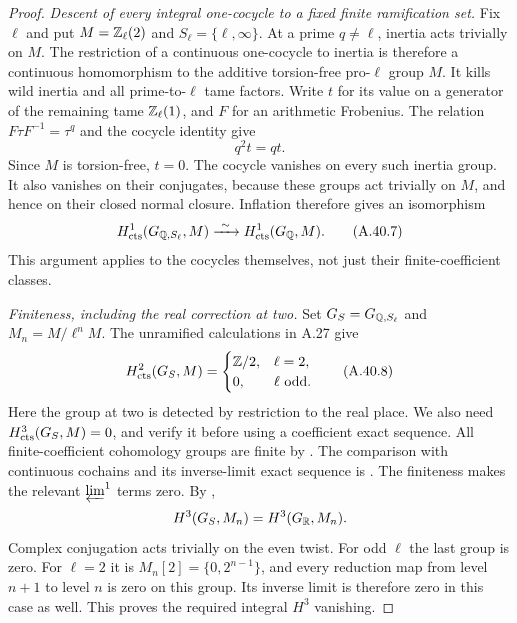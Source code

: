 \begin{proof}
\emph{Descent of every integral one-cocycle to a fixed finite
ramification set.}
Fix $\ell$ and put $M=\mathbb Z_\ell(2)$ and $S_\ell=\{\ell,\infty\}$.
At a prime $q\ne\ell$, inertia acts trivially on $M$.  The
restriction of a continuous one-cocycle to inertia is therefore
a continuous homomorphism to the additive torsion-free pro-$\ell$
group $M$.  It kills wild inertia and all prime-to-$\ell$ tame
factors.  Write $t$ for its value on a generator of the remaining
tame $\mathbb Z_\ell(1)$, and $F$ for an arithmetic Frobenius.  The
relation $F\tau F^{-1}=\tau^q$ and the cocycle identity give
\[
                         q^2t=qt.
 \tag{A.40.6}
\]
Since $M$ is torsion-free, $t=0$.  The cocycle vanishes on every
such inertia group.  It also vanishes on their conjugates, because
these groups act trivially on $M$, and hence on their closed normal
closure.  Inflation therefore gives an isomorphism
\[
 H^1_{\rm cts}(G_{\mathbb Q,S_\ell},M)
       \xrightarrow{\ \sim\ }H^1_{\rm cts}(G_\mathbb Q,M).
 \tag{A.40.7}
\]
This argument applies to the cocycles themselves, not just their
finite-coefficient classes.

\emph{Finiteness, including the real correction at two.}
Set $G_S=G_{\mathbb Q,S_\ell}$ and $M_n=M/\ell^nM$.  The unramified
calculations in A.27 give
\[
 H^2_{\rm cts}(G_S,M)=
 \begin{cases}\mathbb Z/2,&\ell=2,\\0,&\ell\text{ odd}.\end{cases}
 \tag{A.40.8}
\]
Here the group at two is detected by restriction to the real
place.  We also need $H^3_{\rm cts}(G_S,M)=0$, and verify it
before using a coefficient exact sequence.  All finite-coefficient
cohomology groups are finite by
\cite[I, Corollary 4.15]{BIR_MilneADT}.  The comparison with
continuous cochains and its inverse-limit exact sequence is
\cite[\S1, (1.6), and Theorem 2.2]{BIR_Jannsen1988}.
The finiteness makes the relevant $\varprojlim^1$ terms zero.
By \cite[I, Theorem 4.10(c)]{BIR_MilneADT},
\[
                 H^3(G_S,M_n)=H^3(G_\mathbb R,M_n).
\]
Complex conjugation acts trivially on the even twist.  For odd
$\ell$ the last group is zero.  For $\ell=2$ it is
$M_n[2]=\{0,2^{n-1}\}$, and every reduction map from level
$n+1$ to level $n$ is zero on this group.  Its inverse limit is
therefore zero in this case as well.  This proves the required
integral $H^3$ vanishing.


\end{proof}
